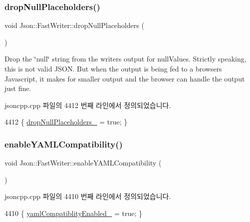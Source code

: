 \subsubsection{\texorpdfstring{drop\+Null\+Placeholders()}{dropNullPlaceholders()}}
{\footnotesize\ttfamily void Json\+::\+Fast\+Writer\+::drop\+Null\+Placeholders (\begin{DoxyParamCaption}{ }\end{DoxyParamCaption})}



Drop the \char`\"{}null\char`\"{} string from the writer\textquotesingle{}s output for null\+Values. Strictly speaking, this is not valid J\+S\+ON. But when the output is being fed to a browser\textquotesingle{}s Javascript, it makes for smaller output and the browser can handle the output just fine. 



jsoncpp.\+cpp 파일의 4412 번째 라인에서 정의되었습니다.


\begin{DoxyCode}
4412 \{ \hyperlink{class_json_1_1_fast_writer_a97e9d4ff84b59a48756dcc27a71b5904}{dropNullPlaceholders\_} = \textcolor{keyword}{true}; \}
\end{DoxyCode}
\mbox{\label{class_json_1_1_fast_writer_a78d98e9f76d33660ad6e6a1abe287d45}} 
\subsubsection{\texorpdfstring{enable\+Y\+A\+M\+L\+Compatibility()}{enableYAMLCompatibility()}}
{\footnotesize\ttfamily void Json\+::\+Fast\+Writer\+::enable\+Y\+A\+M\+L\+Compatibility (\begin{DoxyParamCaption}{ }\end{DoxyParamCaption})}



jsoncpp.\+cpp 파일의 4410 번째 라인에서 정의되었습니다.


\begin{DoxyCode}
4410 \{ \hyperlink{class_json_1_1_fast_writer_a4c4c1911179bf472d24492915b0e489a}{yamlCompatiblityEnabled\_} = \textcolor{keyword}{true}; \}
\end{DoxyCode}
\mbox{\label{class_json_1_1_fast_writer_af4ee077d365d75941fb2688d97207a55}} 
